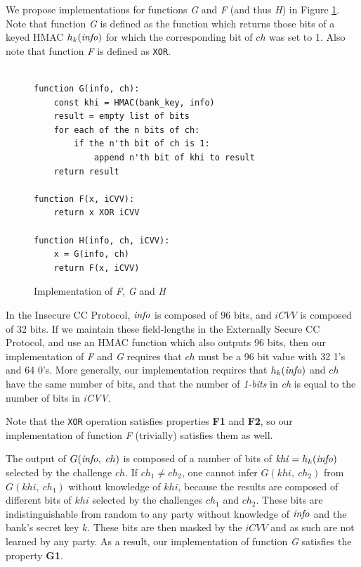 We propose implementations for functions \emph{G} and \emph{F} (and thus \emph{H}) in Figure \ref{fig:implementation}.
Note that function \emph{G} is defined as the function which returns those bits of a keyed HMAC $h_k(\textrm{\emph{info}})$ for which the corresponding bit of $ch$ was set to 1.
Also note that function \emph{F} is defined as \texttt{XOR}.

\begin{figure}[h!]
  \caption{Implementation of \emph{F}, \emph{G} and \emph{H}}
  \begin{verbatim}

function G(info, ch):
    const khi = HMAC(bank_key, info)
    result = empty list of bits
    for each of the n bits of ch:
        if the n'th bit of ch is 1:
            append n'th bit of khi to result
    return result

function F(x, iCVV):
    return x XOR iCVV

function H(info, ch, iCVV):
    x = G(info, ch)
    return F(x, iCVV)
\end{verbatim}
  \label{fig:implementation}
\end{figure}

In the Insecure CC Protocol, $\textrm{\emph{info}}$ is composed of 96 bits, and $iCVV$ is composed of 32 bits.
If we maintain these field-lengths in the Externally Secure CC Protocol, and use an HMAC function which also outputs 96 bits, then our implementation of \emph{F} and \emph{G} requires that $ch$ must be a 96 bit value with 32 1's and 64 0's.
More generally, our implementation requires that $h_k(\textrm{\emph{info}})$ and $ch$ have the same number of bits,
	and that the number of \emph{1-bits} in \emph{ch} is equal to the number of bits in \emph{iCVV}.

Note that the \texttt{XOR} operation satisfies properties \textbf{F1} and \textbf{F2}, so our implementation of function \emph{F} (trivially) satisfies them as well.

The output of $G(\textrm{\emph{info}},~ ch)$ is composed of a number of bits of \linebreak $\textrm{\emph{khi}} = h_k(\textrm{\emph{info}})$ selected by the challenge $ch$.
If $ch_1 \neq ch_2$, one cannot infer $G(khi,~ ch_2)$ from $G(khi,~ ch_1)$ without knowledge of $khi$,
because the results are composed of different bits of $khi$ selected by the challenges $ch_1$ and $ch_2$.
These bits are indistinguishable from random to any party without knowledge of $\textrm{\emph{info}}$ and the bank's secret key $k$.
These bits are then masked by the $iCVV$ and as such are not learned by any party.
As a result, our implementation of function \emph{G} satisfies the property \textbf{G1}.
